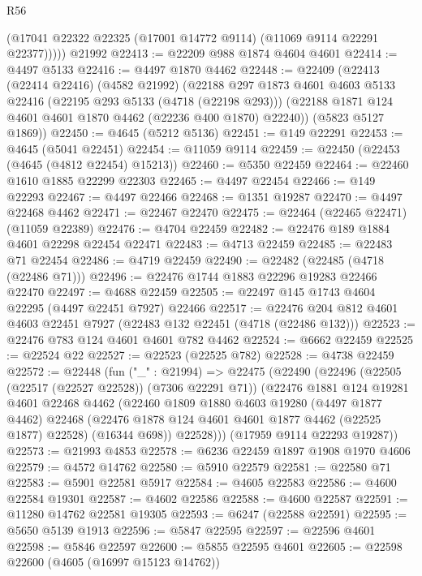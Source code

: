 \begin{lexlean}{R56}
\begin{coremodule}
          (@17041 @22322 @22325 (@17001 @14772 @9114) (@11069 @9114 @22291 @22377)))))
    @21992
@22413 := @22209 @988 @1874 @4604 @4601
@22414 := @4497 @5133
@22416 := @4497 @1870 @4462
@22448 := @22409
    (@22413
      (@22414 @22416)
      (@4582 @21992)
      (@22188
        @297
        @1873
        @4601
        @4603
        @5133
        @22416
        (@22195 @293 @5133 (@4718 (@22198 @293)))
        (@22188 @1871 @124 @4601 @4601 @1870 @4462 (@22236 @400 @1870) @22240))
      (@5823 @5127 @1869))
@22450 := @4645 (@5212 @5136)
@22451 := @149 @22291
@22453 := @4645 (@5041 @22451)
@22454 := @11059 @9114
@22459 := @22450 (@22453 (@4645 (@4812 @22454) @15213))
@22460 := @5350 @22459
@22464 := @22460 @1610 @1885 @22299 @22303
@22465 := @4497 @22454
@22466 := @149 @22293
@22467 := @4497 @22466
@22468 := @1351 @19287
@22470 := @4497 @22468 @4462
@22471 := @22467 @22470
@22475 := @22464 (@22465 @22471) (@11059 @22389)
@22476 := @4704 @22459
@22482 := @22476 @189 @1884 @4601 @22298 @22454 @22471
@22483 := @4713 @22459
@22485 := @22483 @71 @22454
@22486 := @4719 @22459
@22490 := @22482 (@22485 (@4718 (@22486 @71)))
@22496 := @22476 @1744 @1883 @22296 @19283 @22466 @22470
@22497 := @4688 @22459
@22505 := @22497 @145 @1743 @4604 @22295 (@4497 @22451 @7927) @22466
@22517 := @22476 @204 @812 @4601 @4603 @22451 @7927 (@22483 @132 @22451 (@4718 (@22486 @132)))
@22523 := @22476 @783 @124 @4601 @4601 @782 @4462
@22524 := @6662 @22459
@22525 := @22524 @22
@22527 := @22523 (@22525 @782)
@22528 := @4738 @22459
@22572 := @22448
    (fun ("_" : @21994) =>
    @22475
      (@22490
        (@22496
          (@22505 (@22517 (@22527 @22528)) (@7306 @22291 @71))
          (@22476
            @1881
            @124
            @19281
            @4601
            @22468
            @4462
            (@22460
              @1809
              @1880
              @4603
              @19280
              (@4497 @1877 @4462)
              @22468
              (@22476 @1878 @124 @4601 @4601 @1877 @4462 (@22525 @1877) @22528)
              (@16344 @698))
            @22528)))
      (@17959 @9114 @22293 @19287))
@22573 := @21993 @4853
@22578 := @6236 @22459 @1897 @1908 @1970 @4606
@22579 := @4572 @14762
@22580 := @5910 @22579
@22581 := @22580 @71
@22583 := @5901 @22581 @5917
@22584 := @4605 @22583
@22586 := @4600 @22584 @19301
@22587 := @4602 @22586
@22588 := @4600 @22587
@22591 := @11280 @14762 @22581 @19305
@22593 := @6247 (@22588 @22591)
@22595 := @5650 @5139 @1913
@22596 := @5847 @22595
@22597 := @22596 @4601
@22598 := @5846 @22597
@22600 := @5855 @22595 @4601
@22605 := @22598 @22600 (@4605 (@16997 @15123 @14762))

\end{coremodule}
\end{lexlean}
